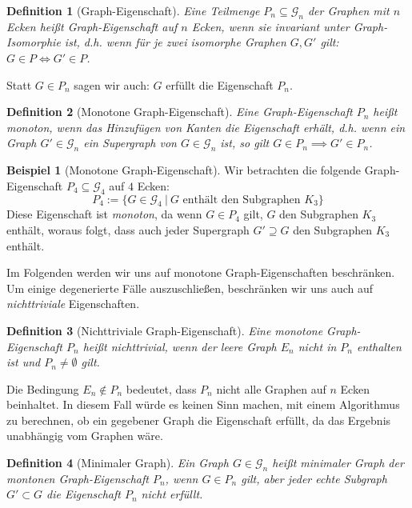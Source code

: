 \documentclass[10pt,a4paper, footheight=1mm, bibliography=totoc]{scrreprt}
\newtheorem{definition}{Definition}
\theoremstyle{definition}
\newtheorem{examplex}{Beispiel}
\newenvironment{example}[1]
{ \begin{leftbar} \begin{examplex}#1}
{ \end{examplex} \ignorespacesafterend \end{leftbar} }
\begin{document}
\begin{definition}[Graph-Eigenschaft]
Eine Teilmenge $P_n \subseteq \mathcal{G}_n$ der Graphen mit
$n$ Ecken heißt \emph{Graph-Eigenschaft auf $n$ Ecken},
wenn sie invariant unter Graph-Isomorphie ist,
d.h. wenn für je zwei isomorphe Graphen $G, G'$ gilt:
$G \in P \iff G' \in P$.
\end{definition}
Statt $G \in P_n$ sagen wir auch: $G$ erfüllt die Eigenschaft $P_n$.


\begin{definition}[Monotone Graph-Eigenschaft]
Eine Graph-Eigenschaft $P_n$ heißt \emph{monoton}, wenn das
Hinzufügen von Kanten die Eigenschaft erhält,
d.h. wenn ein Graph
$G' \in \mathcal{G}_n$ ein Supergraph von
$G \in \mathcal{G}_n$ ist, so gilt 
$G \in P_n \implies G' \in P_n$.
\end{definition}

\begin{example}[Monotone Graph-Eigenschaft]
\label{exmpl:Monotonie}
Wir betrachten die folgende Graph-Eigenschaft 
$P_4 \subseteq \mathcal{G}_4$ auf $4$ Ecken:
$$P_4 := \{ G \in \mathcal{G}_4 \ | \ G \text{ enthält den Subgraphen } K_3 \}$$
Diese Eigenschaft ist \emph{monoton}, da wenn 
$G \in P_4$ gilt, $G$ den Subgraphen $K_3$
enthält, woraus folgt, dass auch jeder Supergraph $G'\supseteq G$
den Subgraphen $K_3$ enthält. 
\end{example}

Im Folgenden werden wir uns auf monotone Graph-Eigenschaften beschränken.
Um einige degenerierte Fälle auszuschließen, beschränken
wir uns auch auf \emph{nichttriviale} Eigenschaften.
\begin{definition}[Nichttriviale Graph-Eigenschaft]
Eine monotone Graph-Eigenschaft $P_n$ heißt \emph{nichttrivial},
wenn der leere Graph $E_n$ nicht in $P_n$ enthalten ist und
$P_n\neq \emptyset$ gilt.
\end{definition}
Die Bedingung $E_n \notin P_n$ bedeutet, dass $P_n$ nicht
alle Graphen auf $n$ Ecken beinhaltet. In diesem Fall würde
es keinen Sinn machen, mit einem Algorithmus zu berechnen,
ob ein gegebener Graph die Eigenschaft erfüllt, da das Ergebnis
unabhängig vom Graphen wäre.

\begin{definition}[Minimaler Graph]
Ein Graph $G \in \mathcal{G}_n$ heißt
\emph{minimaler Graph der montonen Graph-Eigenschaft $P_n$},
wenn $G \in P_n$ gilt, aber jeder echte Subgraph 
$G' \subset G$ die Eigenschaft $P_n$ nicht erfüllt.
\end{definition}
\end{document}
